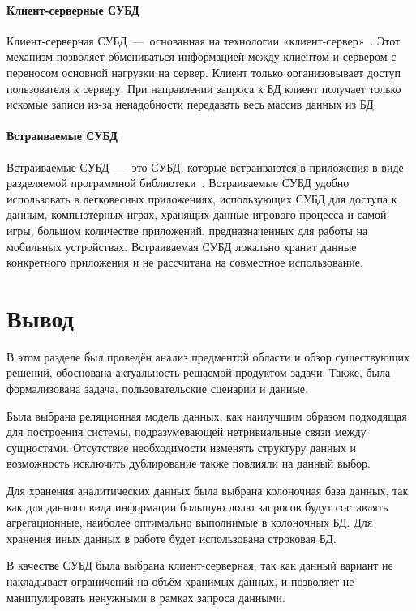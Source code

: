 \paragraph{Клиент-серверные СУБД}\mbox{}

Клиент-серверная СУБД~---~основанная на технологии «клиент-сервер»~\cite{bib16}. Этот механизм позволяет обмениваться информацией между клиентом и сервером с переносом основной нагрузки на сервер. Клиент только организовывает доступ пользователя к серверу. При направлении запроса к БД клиент получает только искомые записи из-за ненадобности передавать весь массив данных из БД.

\newpage

\paragraph{Встраиваемые СУБД}\mbox{}

Встраиваемые СУБД~---~это СУБД, которые встраиваются в приложения в виде разделяемой программной библиотеки~\cite{bib17}. Встраиваемые СУБД удобно использовать в легковесных приложениях, использующих СУБД для доступа к данным, компьютерных играх, хранящих данные игрового процесса и самой игры, большом количестве приложений, предназначенных для работы на мобильных устройствах. Встраиваемая СУБД локально хранит данные конкретного приложения и не рассчитана на совместное использование. 

\section{Вывод}

В этом разделе был проведён анализ предментой области и обзор существующих решений, обоснована актуальность решаемой продуктом задачи. Также, была формализована задача, пользовательские сценарии и данные. 

Была выбрана реляционная модель данных, как наилучшим образом подходящая для построения системы, подразумевающей нетривиальные связи между сущностями. Отсутствие необходимости изменять структуру данных и возможность исключить дублирование также повлияли на данный выбор.

Для хранения аналитических данных была выбрана колоночная база данных, так как для данного вида информации большую долю запросов будут составлять агрегационные, наиболее оптимально выполнимые в колоночных БД. Для хранения иных данных в работе будет использована строковая БД.

В качестве СУБД была выбрана клиент-серверная, так как данный вариант не накладывает ограничений на объём хранимых данных, и позволяет не манипулировать ненужными в рамках запроса данными.

















 
